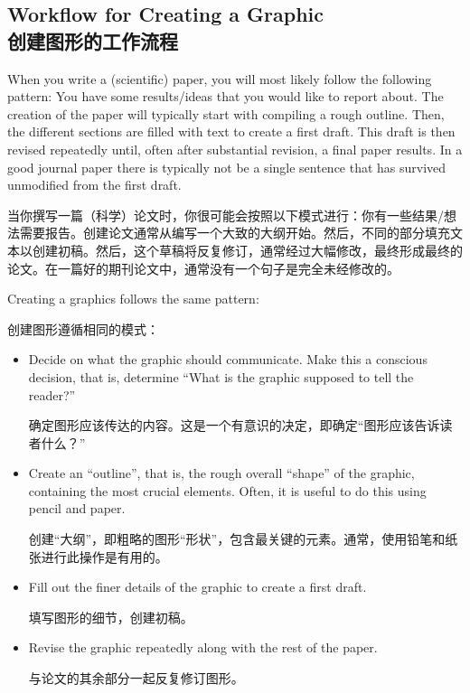 \subsection{Workflow for Creating a Graphic\\创建图形的工作流程}

When you write a (scientific) paper, you will most likely follow the following
pattern: You have some results/ideas that you would like to report about. The
creation of the paper will typically start with compiling a rough outline.
Then, the different sections are filled with text to create a first draft. This
draft is then revised repeatedly until, often after substantial revision, a
final paper results. In a good journal paper there is typically not be a single
sentence that has survived unmodified from the first draft.

当你撰写一篇（科学）论文时，你很可能会按照以下模式进行：你有一些结果/想法需要报告。创建论文通常从编写一个大致的大纲开始。然后，不同的部分填充文本以创建初稿。然后，这个草稿将反复修订，通常经过大幅修改，最终形成最终的论文。在一篇好的期刊论文中，通常没有一个句子是完全未经修改的。

Creating a graphics follows the same pattern:

创建图形遵循相同的模式：
%
\begin{itemize}
    \item Decide on what the graphic should communicate. Make this a
        conscious decision, that is, determine ``What is the graphic supposed
        to tell the reader?''

        确定图形应该传达的内容。这是一个有意识的决定，即确定“图形应该告诉读者什么？”


    \item Create an ``outline'', that is, the rough overall ``shape'' of the
        graphic, containing the most crucial elements. Often, it is useful to
        do this using pencil and paper.

        创建“大纲”，即粗略的图形“形状”，包含最关键的元素。通常，使用铅笔和纸张进行此操作是有用的。


    \item Fill out the finer details of the graphic to create a first draft.

    填写图形的细节，创建初稿。


    \item Revise the graphic repeatedly along with the rest of the paper.

    与论文的其余部分一起反复修订图形。
\end{itemize}



